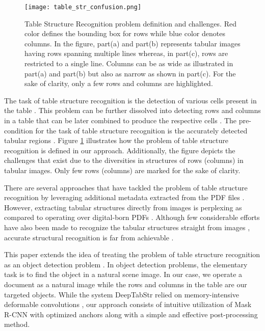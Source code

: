 \documentclass{ieeeaccess}
\begin{document}
\begin{figure}[ht]
    \texttt{[image: table\_str\_confusion.png]}
    \caption{Table Structure Recognition problem definition and challenges. Red color defines the bounding box for rows while blue color denotes columns. In the figure, part(a) and part(b) represents tabular images having rows spanning multiple lines whereas, in part(c), rows are restricted to a single line. Columns can be as wide as illustrated in part(a) and part(b) but also as narrow as shown in part(c). For the sake of clarity, only a few rows and columns are highlighted.}
    \label{fig:table_str_confusion}
\end{figure}

The task of table structure recognition is the detection of various cells present in the table \cite{b18}. This problem can be further dissolved into detecting rows and columns in a table that can be later combined to produce the respective cells \cite{b27}. The pre-condition for the task of table structure recognition is the accurately detected tabular regions \cite{b33,b32}. Figure \ref{fig:table_str_confusion} illustrates how the problem of table structure recognition is defined in our approach. Additionally, the figure depicts the challenges that exist due to the diversities in structures of rows (columns) in tabular images. Only few rows (columns) are marked for the sake of clarity.


There are several approaches that have tackled the problem of table structure recognition by leveraging additional metadata extracted from the PDF files \cite{b14,b19}. However, extracting tabular structures directly from images is perplexing as compared to operating over digital-born PDFs \cite{b27}. Although few considerable efforts have also been made to recognize the tabular structures straight from images 
\cite{b28,b32}, accurate structural recognition is far from achievable \cite{b33}.

This paper extends the idea of treating the problem of table structure recognition as an object detection problem \cite{b33}. In object detection problems, the elementary task is to find the object in a natural scene image. In our case, we operate a document as a natural image while the rows and columns in the table are our targeted objects. While the system DeepTabStr \cite{b33} relied on memory-intensive deformable convolutions \cite{b42}, our approach consists of intuitive utilization of Mask R-CNN \cite{b36} with optimized anchors along with a simple and effective post-processing method. 
\end{document}
